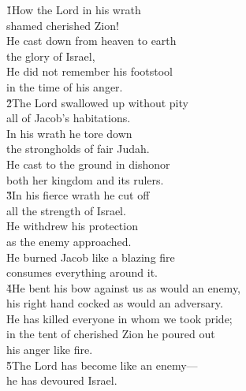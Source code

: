 \begin{poetry}
\poeml {}
\v{1}How the Lord in his wrath \\
\poemll    shamed cherished Zion! \\
\poeml He cast down from heaven to earth \\
\poemll    the glory of Israel, \\
\poeml He did not remember his footstool \\
\poemll    in the time of his anger. \\
\poeml \v{2}The Lord swallowed up without pity \\
\poemll    all of Jacob's habitations. \\
\poeml In his wrath he tore down \\
\poemll    the strongholds of fair Judah. \\
\poeml He cast to the ground in dishonor \\
\poemll    both her kingdom and its rulers. \\
\poeml \v{3}In his fierce wrath he cut off \\
\poemll    all the strength of Israel. \\
\poeml He withdrew his protection \\
\poemll    as the enemy approached. \\
\poeml He burned Jacob like a blazing fire \\
\poemll    consumes everything around it. \\
\poeml \v{4}He bent his bow against us as would an enemy, \\
\poemll    his right hand cocked as would an adversary. \\
\poeml He has killed everyone in whom we took pride; \\
\poemll    in the tent of cherished Zion he poured out \\
\poemlll       his anger like fire. \\
\poeml \v{5}The Lord has become like an enemy--- \\
\poemll    he has devoured Israel. \\

\end{poetry}
